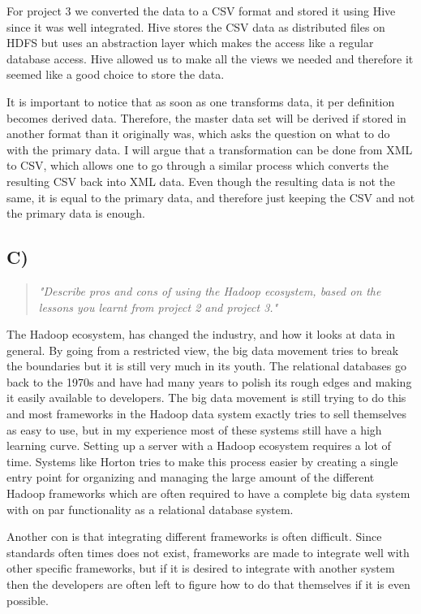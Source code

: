 \newpar For project 3 we converted the data to a CSV format and stored it using Hive since it was well integrated. Hive stores the CSV data as distributed files on HDFS but uses an abstraction layer which makes the access like a regular database access. Hive allowed us to make all the views we needed and therefore it seemed like a good choice to store the data. 

It is important to notice that as soon as one transforms data, it per definition becomes derived data. Therefore, the master data set will be derived if stored in another format than it originally was, which asks the question on what to do with the primary data. I will argue that a transformation can be done from XML to CSV, which allows one to go through a similar process which converts the resulting CSV back into XML data. Even though the resulting data is not the same, it is equal to the primary data, and therefore just keeping the CSV and not the primary data is enough.

\subsection{C)}
\begin{quote}
	\textit{"Describe	pros	and	cons	of	using	the	Hadoop	ecosystem,	based	on	the	lessons	you	learnt	from	project	2	and	project	3."}
\end{quote}

The Hadoop ecosystem, has changed the industry, and how it looks at data in general. By going from a restricted view, the big data movement tries to break the boundaries but it is still very much in its youth. The relational databases go back to the 1970s and have had many years to polish its rough edges and making it easily available to developers. The big data movement is still trying to do this and most frameworks in the Hadoop data system exactly tries to sell themselves as easy to use, but in my experience most of these systems still have a high learning curve. Setting up a server with a Hadoop ecosystem requires a lot of time. Systems like Horton tries to make this process easier by creating a single entry point for organizing and managing the large amount of the different Hadoop frameworks which are often required to have a complete big data system with on par functionality as a relational database system. 

\newpar Another con is that integrating different frameworks is often difficult. Since standards often times does not exist, frameworks are made to integrate well with other specific frameworks, but if it is desired to integrate with another system then the developers are often left to figure how to do that themselves if it is even possible.

